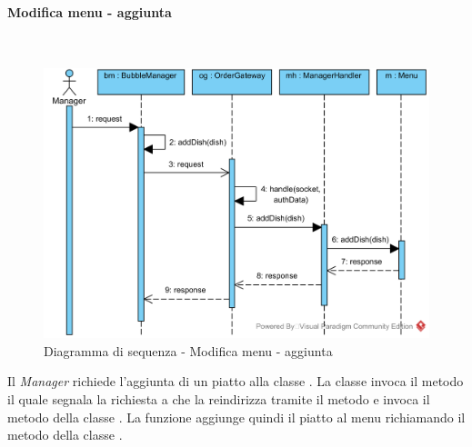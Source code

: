 \paragraph{Modifica menu - aggiunta}\mbox{} \\
\nopagebreak
\begin{figure}[H]
	\centering
	\includegraphics[width=15cm]{./diagrammi/sequenza/modifica_menu_add.png}
	\caption{Diagramma di sequenza - Modifica menu - aggiunta}
\end{figure}
Il \textit{Manager} richiede l'aggiunta di un piatto alla classe . La classe invoca il metodo  il quale segnala la richiesta a  che la reindirizza tramite il metodo  e invoca il metodo  della classe . La funzione aggiunge quindi il piatto al menu richiamando il metodo  della classe .

